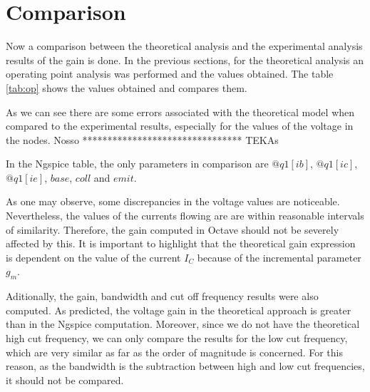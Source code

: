 \section{Comparison}
\label{section:comparison}

\par Now a comparison between the theoretical analysis and the experimental analysis results of the gain is done. In the previous sections, for the theoretical analysis an operating point analysis was performed and the values obtained. The table \ref{tab:op} shows the values obtained and compares them.

\par As we can see there are some errors associated with the theoretical model when compared to the experimental results, especially for the values of the voltage in the nodes.
Nosso
********************************
TEKAs



In the Ngspice table, the only parameters in comparison are $@q1[ib]$, $@q1[ic]$, $@q1[ie]$, $base$, $coll$ and $emit$.
\par As one may observe, some discrepancies in the voltage values are noticeable. Nevertheless, the values of the currents flowing are are within reasonable intervals of similarity. Therefore, the gain computed in Octave should not be severely affected by this. It is important to highlight that the theoretical gain expression is dependent on the value of the current $I_{C}$ because of the incremental parameter $g_{m}$. 

\par Aditionally, the gain, bandwidth and cut off frequency results were also computed. As predicted, the voltage gain in the theoretical approach is greater than in the Ngspice computation. Moreover, since we do not have the theoretical high cut frequency, we can only compare the results for the low cut frequency, which are very similar as far as the order of magnitude is concerned. For this reason, as the bandwidth is the subtraction between high and low cut frequencies, it should not be compared.

